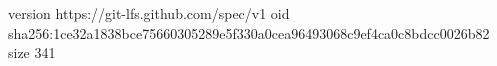 version https://git-lfs.github.com/spec/v1
oid sha256:1ce32a1838bce75660305289e5f330a0cea96493068c9ef4ca0c8bdcc0026b82
size 341
